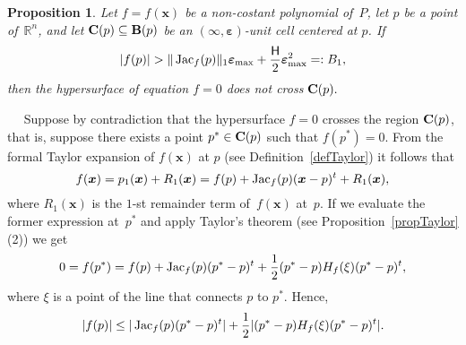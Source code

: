 \documentclass[10pt]{article}
\newcommand{\x}{{\bm x}}
\newcommand\proof{\noindent{\em Proof.}\ \ } \newcommand\mult{\mbox{\rm mult}}
\newcommand\R{{\mathbb R}}
\newcommand{\epsbold}{{\bm \varepsilon}}
\def\Jac{\mathop{\rm Jac}\nolimits}
\newtheorem{prop}[theorem]{Proposition}
\begin{document}
\begin{prop}\label{PropNonPassa} 
Let $f=f(\x)$ be a non-costant polynomial of~$P$,
let $p$ be a point of~$\R^n$, and let ${\bf C}(p) \subseteq {\bf B}(p)$
be an $(\infty,\epsbold)$-unit cell   centered at $p$. If
$$
| f(p)| > \|\Jac_f(p)\|_1 \epsbold_{\rm max} + \frac{\mathsf H}{2} \epsbold_{\rm max}^2 =:B_1,
$$
then the hypersurface  of equation $f=0$ does not cross ${\bf C}(p).$
\end{prop}
\proof
Suppose by contradiction that the hypersurface $f=0$ crosses 
the region ${\bf C}(p)$, that is, suppose there exists a 
point $p^* \in {\bf C}(p)$ such that $f(p^*)=0$.
From the formal Taylor expansion of $f(\x)$ at $p$ (see 
Definition~\ref{defTaylor}) it follows that
$$f(\x) =p_1(\x)+R_1(\x)= f(p) + \Jac_f(p) (\x-p)^t + R_1(\x),$$ 
where $R_1(\bm x)$ is the $1$-st remainder term of~$f(\x)$ at~$p$.
If we evaluate the former expression at~$p^*$ and apply 
Taylor's theorem (see Proposition~\ref{propTaylor}(2)) we get
\begin{eqnarray}\label{TaylorEquality}
0 = f(p^*) = f(p) + \Jac_f(p) (p^*-p)^t + \frac{1}{2}(p^*-p) H_f(\xi) (p^*-p)^t,
\end{eqnarray}
where $\xi$ is a point of the line that connects $p$ to $p^*$.
Hence,
\begin{eqnarray}\label{diseq1}
|f(p)| \le  |\Jac_f(p) (p^*-p)^t| + \frac{1}{2}|(p^*-p) H_f(\xi) (p^*-p)^t|.
\end{eqnarray}
\end{document}
